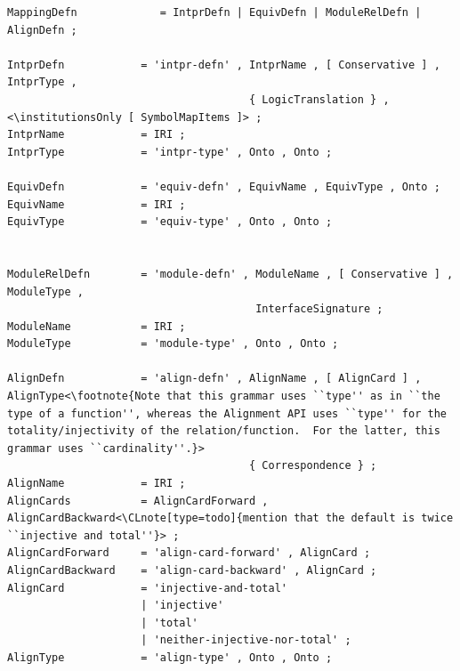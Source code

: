 \documentclass[10pt,%
\ifpretendfinal
final%
\else
draft%
\fi,
]{scrreprt}
\makeatletter
\newcommand*\CommentAuthor{}
\renewcommand*\CommentAuthor{#1}}
\newcommand*\CommentDate{}
\renewcommand*\CommentDate{#1}}
\newcommand*\CommentId{}
\renewcommand*\CommentId{#1}}
\newcommand*\CommentType{}
\renewcommand*\CommentType{#1}}
\newcommand*{\SetCommentColorByType}[1]{%
\edef\localType{{#1}}%
\expandafter\ifstrequal\localType{q-aut}{\colorlet{CommentColor}{red}}{%
\expandafter\ifstrequal\localType{q-all}{\colorlet{CommentColor}{orange}}{%
\expandafter\ifstrequal\localType{todo}{\colorlet{CommentColor}{orange}}{%
\expandafter\ifstrequal\localType{fyi}{\colorlet{CommentColor}{lightgray}}{%
\colorlet{CommentColor}{yellow}}}}}}
\newcommand*{\SetCommentPrefixByType}[1]{%
\edef\localType{{#1}}%
\expandafter\@ifmtarg\localType{%
\edef\CommentPrefix{}%
}{%
\caseupper[q]{#1}%
\edef\CommentPrefix{\thestring: }%
}}
\newcommand*{\initComment}[1]{%
\setkeys{Comment}{#1}%
\SetCommentColorByType{\CommentType}%
\relax%
\SetCommentPrefixByType{\CommentType}%
\relax%
}
\newcommand*{\todonote}[2][]{%
\initComment{#1}%
\pdfcomment[author=\CommentAuthor,color=CommentColor,date=\CommentDate,id=\CommentId]{%
\CommentPrefix
#2}}
\renewcommand*{\todonote}[2][]{%
\initComment{#1}%
\ednote{\CommentPrefix #2}}
\newcommand*{\CLnote}[2][author=Christoph Lange]{%
\todonote[author=Christoph Lange,#1]{#2} 
}
\newcommand*{\institutionsOnly}{\bfseries\itshape}
\makeatother
\begin{document}
\begin{lstlisting}[language=ebnf,escapeinside={<>},mathescape]
MappingDefn             = IntprDefn | EquivDefn | ModuleRelDefn | AlignDefn ;

IntprDefn            = 'intpr-defn' , IntprName , [ Conservative ] , IntprType ,
                                      { LogicTranslation } , <\institutionsOnly [ SymbolMapItems ]> ;
IntprName            = IRI ;
IntprType            = 'intpr-type' , Onto , Onto ;

EquivDefn            = 'equiv-defn' , EquivName , EquivType , Onto ;
EquivName            = IRI ;
EquivType            = 'equiv-type' , Onto , Onto ;


ModuleRelDefn        = 'module-defn' , ModuleName , [ Conservative ] , ModuleType ,
                                       InterfaceSignature ;
ModuleName           = IRI ;
ModuleType           = 'module-type' , Onto , Onto ;

AlignDefn            = 'align-defn' , AlignName , [ AlignCard ] , AlignType<\footnote{Note that this grammar uses ``type'' as in ``the type of a function'', whereas the Alignment API uses ``type'' for the totality/injectivity of the relation/function.  For the latter, this grammar uses ``cardinality''.}> 
                                      { Correspondence } ;
AlignName            = IRI ;
AlignCards           = AlignCardForward , AlignCardBackward<\CLnote[type=todo]{mention that the default is twice ``injective and total''}> ;
AlignCardForward     = 'align-card-forward' , AlignCard ;
AlignCardBackward    = 'align-card-backward' , AlignCard ;
AlignCard            = 'injective-and-total'
                     | 'injective'
                     | 'total'
                     | 'neither-injective-nor-total' ;
AlignType            = 'align-type' , Onto , Onto ;


\end{lstlisting}
\end{document}
